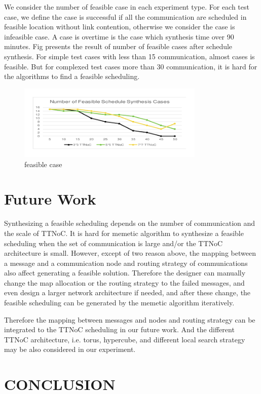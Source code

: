 \documentclass[conference]{IEEEtran}
\begin{document}
We consider the number of feasible  case in each experiment type. For each test case, we define the case is successful if all the communication are scheduled in feasible location without link contention, otherwise we consider the case is infeasible case. A case is overtime is the case which synthesis time over 90 minutes. Fig presents the result of number of feasible cases after schedule synthesis. For simple test cases with less than 15 communication, almost cases is feasible. But for complexed test cases more than 30 communication, it is hard for the algorithms to find a feasible scheduling.
\begin{figure}[!t]
	\centering
	\includegraphics[width=3.5in]{picture/feasible}
	\caption{feasible case}
	\label{feasible case}
\end{figure}

\section{Future Work}

Synthesizing a feasible scheduling depends on the number of communication and the scale of TTNoC. It is hard for memetic algorithm to synthesize a feasible scheduling when the set of communication is large and/or the TTNoC architecture is small. However, except of two reason above, the mapping between a message and a communication node and routing strategy of communications also affect generating a feasible solution. Therefore the designer can manually change the map allocation or the routing strategy to the failed messages, and even design a larger network architecture if needed, and after these change, the feasible scheduling can be generated by the memetic algorithm iteratively. 

Therefore the mapping between messages and nodes and routing strategy can be integrated to the TTNoC scheduling in our future work. And the different TTNoC architecture, i.e. torus, hypercube, and different local search strategy may be also considered in our experiment.

\section{CONCLUSION}
\end{document}
